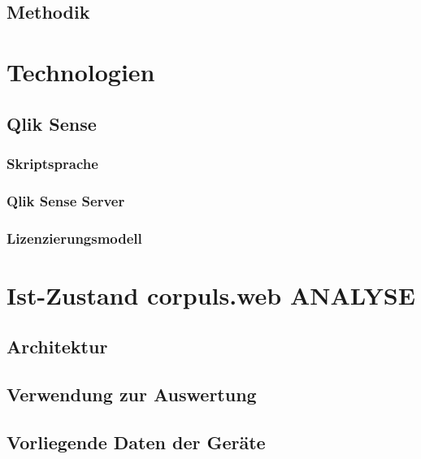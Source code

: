 \subsection{Methodik}

\section{Technologien}
\subsection{Qlik Sense}
\subsubsection{Skriptsprache}
\subsubsection{Qlik Sense Server}
\subsubsection{Lizenzierungsmodell}

\section{Ist-Zustand corpuls.web ANALYSE}
\subsection{Architektur}
\subsection{Verwendung zur Auswertung}
\subsection{Vorliegende Daten der Geräte}



